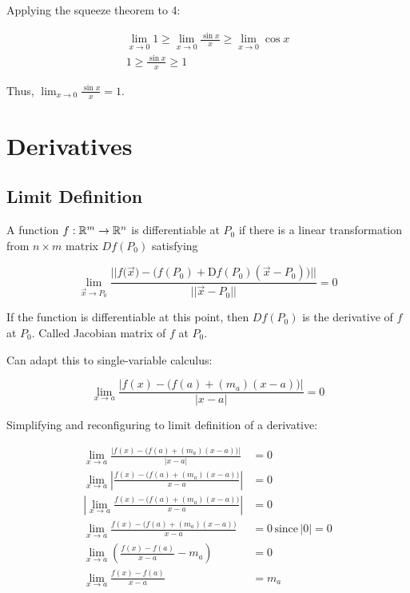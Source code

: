 Applying the squeeze theorem to 4:

\begin{gather*}
    \lim_{x\to 0}1\geq \lim_{x\to 0}\frac{\sin x}{x}\geq \lim_{x\to 0} \cos x\\
    1\geq \frac{\sin x}{x}\geq 1
\end{gather*}

Thus, $\lim_{x\to 0}\frac{\sin x}{x}=1$.

\section{Derivatives}

\subsection{Limit Definition}

A function $f:\mathbb{R}^m \to \mathbb{R}^n$ is differentiable at $P_0$ if there is a linear transformation from $n\times m$ matrix $Df(P_0)$ satisfying

\[\lim_{\vec{x}\to P_0}\frac{\big\vert \big\vert f \big( \vec{x} \big)-\big(f(P_0)+\mathrm{D}f(P_0)(\vec{x}-P_0) \big) \big\vert \big\vert}{\vert \vert \vec{x}-P_0 \vert \vert}=0\]

If the function is differentiable at this point, then $Df(P_0)$ is the derivative of $f$ at $P_0$. Called Jacobian matrix of $f$ at $P_0$.

Can adapt this to single-variable calculus:

\[\displaystyle \lim_{x\to a} \frac{\vert f(x)-\big(f(a)+(m_a)(x-a)\big) \vert}{\vert x-a \vert}=0\]

Simplifying and reconfiguring to limit definition of a derivative:

\begin{align*}
    \lim_{x\to a} \frac{\vert f(x)-\big(f(a)+(m_a)(x-a)\big) \vert}{\vert x-a \vert}&=0\\
    \lim_{x\to a}\left\vert \frac{f(x)-\big(f(a)+(m_a)(x-a)\big)}{x-a} \right\vert&=0\\
    \left \vert \lim_{x\to a} \frac{f(x)-\big(f(a)+(m_a)(x-a)\big)}{x-a} \right \vert&=0\\
    \lim_{x\to a} \frac{f(x)-\big(f(a)+(m_a)(x-a)\big)}{x-a}&=0 \, \mbox{since}\, \vert 0 \vert=0\\ 
    \lim_{x\to a} \left( \frac{f(x)-f(a)}{x-a}-m_a\right)&=0\\
    \lim_{x\to a}\frac{f(x)-f(a)}{x-a}&=m_a
\end{align*}

